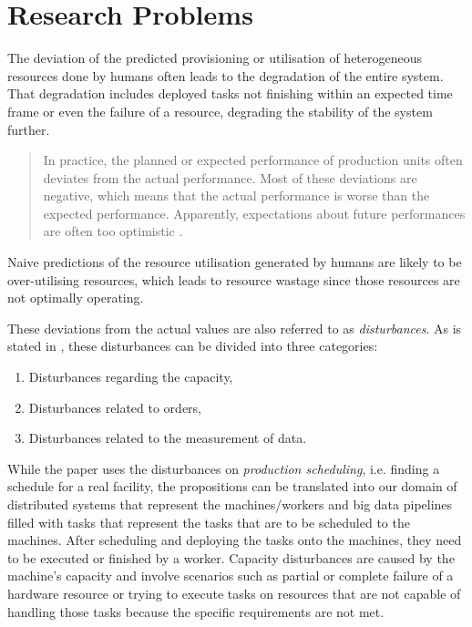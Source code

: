         \section{Research Problems}
        \label{sec:research-problems-introduction}

        The deviation of the predicted provisioning or utilisation of heterogeneous resources done by humans often leads to the degradation of the entire system. That degradation includes deployed tasks not finishing within an expected time frame or even the failure of a resource, degrading the stability of the system further.
        \begin{quote}
            In practice, the planned or expected performance of production units often deviates from the actual performance. Most of these deviations are negative, which means that the actual performance is worse than the expected performance. Apparently, expectations about future performances are often too optimistic \cite{stoopComplexitySchedulingPractice1996}.
        \end{quote}
        Naive predictions of the resource utilisation generated by humans are likely to be over-utilising resources, which leads to resource wastage since those resources are not optimally operating. 
        
        These deviations from the actual values are also referred to as \emph{disturbances}.
        As is stated in \cite{stoopComplexitySchedulingPractice1996}, these disturbances can be divided into three categories:
        \begin{enumerate}
            \item Disturbances regarding the capacity,
            \item Disturbances related to orders,
            \item Disturbances related to the measurement of data.
        \end{enumerate}
        While the paper uses the disturbances on \emph{production scheduling}, i.e. finding a schedule for a real facility, the propositions can be translated into our domain of distributed systems that represent the machines/workers and big data pipelines filled with tasks that represent the tasks that are to be scheduled to the machines. After scheduling and deploying the tasks onto the machines, they need to be executed or finished by a worker.
        Capacity disturbances are caused by the machine's capacity and involve scenarios such as partial or complete failure of a hardware resource or trying to execute tasks on resources that are not capable of handling those tasks because the specific requirements are not met. 
        
